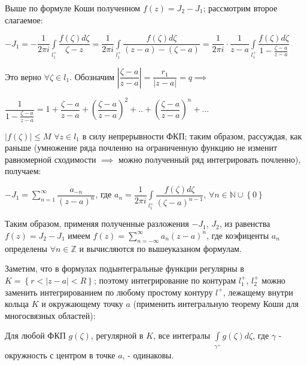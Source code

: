 \documentclass[a4paper, 12pt]{article}
\begin{document}
  \quad Выше по формуле Коши полученном $f(z) = J_2 - J_1$; рассмотрим второе слагаемое:

  \begin{center}

    $-J_1 = -\dfrac{1}{2 \pi i} \displaystyle\int\limits_{l_1^+} \dfrac{f(\zeta) d\zeta}{\zeta - z} = \dfrac{1}{2 \pi i} \displaystyle\int\limits_{l_1^+} \dfrac{f(\zeta) d\zeta}{(z-a) - (\zeta -a)} = \dfrac{1}{2 \pi i} \cdot \dfrac{1}{z-a} \displaystyle\int\limits_{l_1^+} \dfrac{f(\zeta)d\zeta}{1 - \frac{\zeta - a}{z - a}}$ 

  \end{center}

  \quad Это верно $\forall \zeta \in l_1$. Обозначим $\left| \dfrac{\zeta - a}{z - a} \right| = \dfrac{r_1}{|z-a|} = q \implies $

  \begin{center}
    $\dfrac{1}{1 - \frac{\zeta - a}{z - a}} = 1 + \dfrac{\zeta - a}{z - a} + \left( \dfrac{\zeta - a}{z - a} \right)^2 + .. + \left( \dfrac{\zeta - a}{z - a} \right)^n + ...$
  \end{center}

  \quad $|f(\zeta)| \leq M$ $\forall z \in l_1$ в силу непрерывности ФКП; таким образом, рассуждая, как раньше (умножение ряда почленно на ограниченную функцию не изменит равномерной сходимости $\implies$ можно полученный ряд интегрировать почленно), получаем:

  \begin{center}
    $-J_1 = \displaystyle\sum\limits_{n=1}^{\infty} \dfrac{a_{-n}}{(z-a)^n}$, где $a_n = \dfrac{1}{2 \pi i} \displaystyle\int\limits_{l_1^+} \dfrac{f(\zeta) d\zeta}{(\zeta - a)^{n-1}}$, $\forall n \in \mathbb{N} \cup \left\{0 \right\} $  
  \end{center}
  
  \quad Таким образом, применяя полученные разложения $-J_1$, $J_2$, из равенства $f(z) = J_2 - J_1$ имеем $f(z) = \displaystyle\sum\limits_{n=-\infty}^{\infty} a_n (z-a)^n$, где коэфиценты $a_n$ определены $\forall n \in \mathbb{Z}$ и вычисляются по вышеуказаном формулам.

  \quad Заметим, что в формулах подынтегральные функции регулярны в $K = \left\{ r < |z - a| < R \right\}$; поэтому интегрирование по контурам $l_1^+$, $l_2^+$ можно заменить интегрированием по любому простому контуру $l^+$, лежащему внутри кольца $K$ и окружающему точку $a$ (применить интегральную теорему Коши для многосвязных областей):

  \quad Для любой ФКП $g(\zeta)$, регулярной в $K$, все интегралы $\displaystyle\int\limits_{\gamma^+} g(\zeta) d\zeta$, где $\gamma$ - окружность с центром в точке $a$, - одинаковы. 
\end{document}
